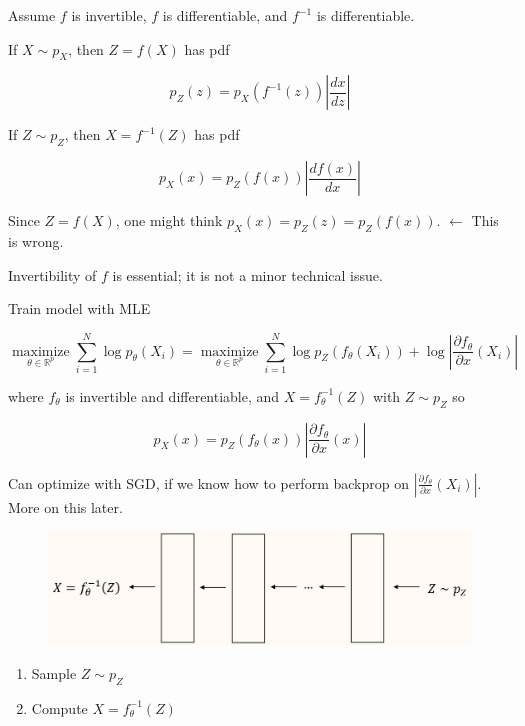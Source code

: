 \begin{concept}
    Assume $f$ is invertible, $f$ is differentiable, and $f^{-1}$ is differentiable.

    If $X \sim p_{X}$, then $Z=f(X)$ has pdf

    $$
    p_{Z}(z)=p_{X}\left(f^{-1}(z)\right)\left|\frac{d x}{d z}\right|
    $$

    If $Z \sim p_{Z}$, then $X=f^{-1}(Z)$ has pdf

    $$
    p_{X}(x)=p_{Z}(f(x))\left|\frac{d f(x)}{d x}\right|
    $$

    Since $Z=f(X)$, one might think $p_{X}(x)=p_{Z}(z)=p_{Z}(f(x))$. $\leftarrow$ This is wrong.

    Invertibility of $f$ is essential; it is not a minor technical issue.
\end{concept}

\begin{definition}
    Train model with MLE

    $$
    \underset{\theta \in \mathbb{R}^{p}}{\operatorname{maximize}} \sum_{i=1}^{N} \log p_{\theta}\left(X_{i}\right)=\underset{\theta \in \mathbb{R}^{p}}{\operatorname{maximize}} \sum_{i=1}^{N} \log p_{Z}\left(f_{\theta}\left(X_{i}\right)\right)+\log \left|\frac{\partial f_{\theta}}{\partial x}\left(X_{i}\right)\right|
    $$

    where $f_{\theta}$ is invertible and differentiable, and $X=f_{\theta}^{-1}(Z)$ with $Z \sim p_{Z}$ so

    $$
    p_{X}(x)=p_{Z}\left(f_{\theta}(x)\right)\left|\frac{\partial f_{\theta}}{\partial x}(x)\right|
    $$

    Can optimize with SGD, if we know how to perform backprop on $\left|\frac{\partial f_{\theta}}{\partial x}\left(X_{i}\right)\right|$. More on this later.
\end{definition}

\begin{definition}
    \begin{figure}[H]
        \centering
        \includegraphics[width=1.0\textwidth]{.././assets/10.7.png}
    \end{figure}

    \begin{enumerate}
        \item Sample $Z \sim p_{Z}$
        \item Compute $X=f_{\theta}^{-1}(Z)$
    \end{enumerate}
\end{definition}

